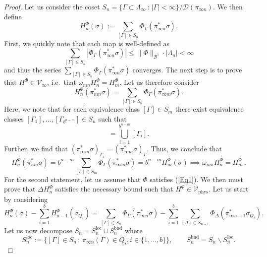\documentclass[10pt,a4paper]{amsart}
\newcommand{\bnd}{\mathrm{bnd}}
\newcommand{\loc}{\mathrm{loc}}
\newcommand{\phys}{\mathrm{phys}}
\begin{document}
\begin{proof}
    Let us consider the coset $S_n=\{\Gamma\subset\Lambda_\infty\,:\,|\Gamma|<\infty\}/\mathcal{D}(\pi_{\infty n})$. We then define
    \begin{equation}
        H^{\Phi}_n(\sigma):=\sum_{[\Gamma]\in S_n}\Phi_\Gamma(\pi_{\infty n}^*\sigma).
    \end{equation}
    First, we quickly note that each map is well-defined as 
    \begin{equation}
        \sum_{[\Gamma]\in S_n}|\Phi_\Gamma(\pi_{\infty n}^*\sigma)|\leq\|\Phi\|_{\mathcal{B}^1}\cdot|\Lambda_n|<\infty
    \end{equation}
    and thus the series $\sum_{[\Gamma]\in S_n}\Phi_\Gamma(\pi_{\infty n}^*\sigma)$ converges. The next step is to prove that $H^\Phi\in \mathcal{V}_\infty$, i.e.\ that $\omega_{nm}H_n^\Phi=H_m^\Phi$. Let us therefore consider
    \begin{equation}
        H_n^\Phi(\pi_{nm}^*\sigma)=\sum_{[\Gamma]\in S_n}\Phi_\Gamma(\pi_{\infty m}^*\sigma).
    \end{equation}
    Here, we note that for each equivalence class $[\Gamma]\in S_m$ there exist equivalence classes $[\Gamma_1],...,[\Gamma_{b^{n-m}}]\in S_n$ such that
    \begin{equation}
        [\Gamma]=\bigcup_{i=1}^{b^{n-m}}[\Gamma_i].
    \end{equation}
    Further, we find that $(\pi_{\infty m}^*\sigma)_{\Gamma_i}=(\pi_{\infty m}^*\sigma)_\Gamma$. Thus, we conclude that
    \begin{equation}
        H_n^\Phi(\pi_{nm}^*\sigma)=b^{n-m}\sum_{[\Gamma]\in S_m}\Phi_\Gamma(\pi_{\infty m}^*\sigma)=b^{n-m}H_{m}^\Phi(\sigma)\implies\omega_{nm}H_n^\Phi=H_m^\Phi\,.
    \end{equation}
    For the second statement, let us assume that $\Phi$ satisfies (\ref{Eq1}). We then must prove that $\Delta H_n^\Phi$ satisfies the necessary bound such that $H^\Phi\in \mathcal{V}_\phys$. Let us start by considering
    \begin{equation}
        H_{n}^\Phi(\sigma)-\sum_{i=1}^bH_{n-1}^\Phi(\sigma_{Q_i})=\sum_{[\Gamma]\in S_n}\Phi_\Gamma(\pi_{\infty n}^*\sigma)-\sum_{i=1}^b\sum_{[\Delta]\in S_{n-1}}\Phi_\Delta(\pi_{\infty n-1}^*\sigma_{Q_i}).
    \end{equation}
    Let us now decompose $S_n=S^\loc_n\cup S_n^\bnd$ where
    \begin{equation}
        S_n^\loc:=\{[\Gamma]\in S_n\,:\,\pi_{\infty n}(\Gamma)\in Q_i,i\in\{1,...,b\}\},\qquad S_n^\bnd=S_n\backslash S_n^\loc.

\end{equation}
\end{proof}
\end{document}
